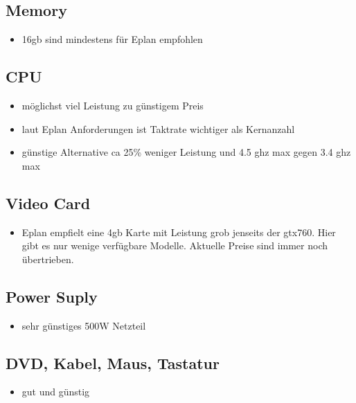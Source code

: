 \subsection{Memory}
\label{sec:org147a7f9}
\begin{itemize}
\item 16gb sind mindestens für Eplan empfohlen
\end{itemize}
\subsection{CPU}
\label{sec:orgb57bb96}
\begin{itemize}
\item möglichst viel Leistung zu günstigem Preis
\item laut Eplan Anforderungen ist Taktrate wichtiger als Kernanzahl
\item günstige Alternative ca 25\% weniger Leistung und 4.5 ghz max gegen 3.4 ghz max
\end{itemize}
\subsection{Video Card}
\label{sec:orgc22bb64}
\begin{itemize}
\item Eplan empfielt eine 4gb Karte mit Leistung grob jenseits der gtx760. Hier gibt es nur wenige verfügbare Modelle. Aktuelle Preise sind immer noch übertrieben.
\end{itemize}
\subsection{Power Suply}
\label{sec:orga4a5ba0}
\begin{itemize}
\item sehr günstiges 500W Netzteil
\end{itemize}

\subsection{DVD, Kabel, Maus, Tastatur}
\label{sec:org859e582}
\begin{itemize}
\item gut und günstig
\end{itemize}
